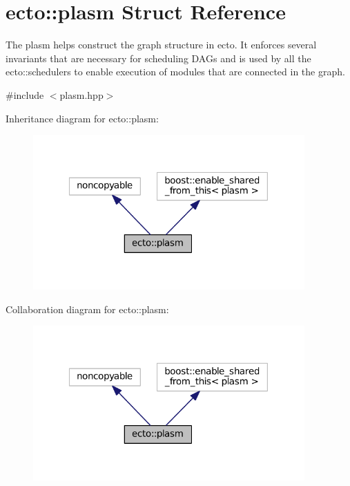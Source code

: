 \hypertarget{structecto_1_1plasm}{\section{ecto\-:\-:plasm Struct Reference}
\label{structecto_1_1plasm}
}


The plasm helps construct the graph structure in ecto. It enforces several invariants that are necessary for scheduling D\-A\-Gs and is used by all the ecto\-::schedulers to enable execution of modules that are connected in the graph.  




{\ttfamily \#include $<$plasm.\-hpp$>$}



Inheritance diagram for ecto\-:\-:plasm\-:\nopagebreak
\begin{figure}[H]
\begin{center}
\leavevmode
\includegraphics[width=295pt]{structecto_1_1plasm__inherit__graph}
\end{center}
\end{figure}


Collaboration diagram for ecto\-:\-:plasm\-:\nopagebreak
\begin{figure}[H]
\begin{center}
\leavevmode
\includegraphics[width=295pt]{structecto_1_1plasm__coll__graph}
\end{center}
\end{figure}
